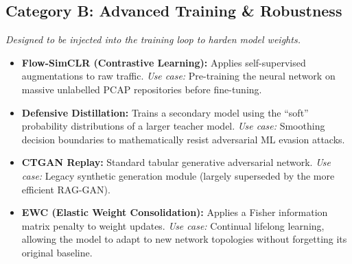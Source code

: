 \documentclass[11pt,a4paper]{article}
\begin{document}
\subsection{Category B: Advanced Training \& Robustness}
\textit{Designed to be injected into the training loop to harden model weights.}
\begin{itemize}
    \item \textbf{Flow-SimCLR (Contrastive Learning):} Applies self-supervised augmentations to raw traffic. \textit{Use case:} Pre-training the neural network on massive unlabelled PCAP repositories before fine-tuning.
    \item \textbf{Defensive Distillation:} Trains a secondary model using the ``soft'' probability distributions of a larger teacher model. \textit{Use case:} Smoothing decision boundaries to mathematically resist adversarial ML evasion attacks.
    \item \textbf{CTGAN Replay:} Standard tabular generative adversarial network. \textit{Use case:} Legacy synthetic generation module (largely superseded by the more efficient RAG-GAN).
    \item \textbf{EWC (Elastic Weight Consolidation):} Applies a Fisher information matrix penalty to weight updates. \textit{Use case:} Continual lifelong learning, allowing the model to adapt to new network topologies without forgetting its original baseline.
\end{itemize}
\end{document}
